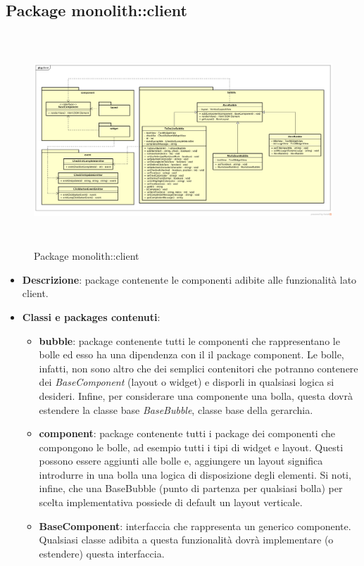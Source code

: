 \subsection{Package monolith::client}

\label{Package monolith::client}
\begin{figure}[H]
	\centering
	\includegraphics[width=16cm, height=8cm]{Sezioni/Packages/SDK/client.png}
	\caption{Package monolith::client}
\end{figure}

\begin{itemize}
\item \textbf{Descrizione}: package contenente le componenti adibite alle funzionalità lato client. 
\item \textbf{Classi e packages contenuti}:
\begin{itemize}
	\item \textbf{bubble}: package contenente tutti le componenti che rappresentano le bolle ed esso ha una dipendenza con il il package component. Le bolle, infatti, non sono altro che dei semplici contenitori che potranno contenere dei \textit{BaseComponent} (layout o widget) e disporli in qualsiasi logica si desideri. Infine, per considerare una componente una bolla, questa dovrà estendere la classe base \textit{BaseBubble}, classe base della gerarchia.
	\item \textbf{component}: package contenente tutti i package dei componenti che compongono le bolle, ad esempio tutti i tipi di widget e layout. Questi possono essere aggiunti alle bolle e, aggiungere un layout significa introdurre in una bolla una logica di disposizione degli elementi. Si noti, infine, che una BaseBubble (punto di partenza per qualsiasi bolla) per scelta implementativa possiede di default un layout verticale.
	\item \textbf{BaseComponent}: interfaccia che rappresenta un generico componente. Qualsiasi classe adibita a questa funzionalità dovrà implementare (o estendere) questa interfaccia.
\end{itemize}
\end{itemize}

